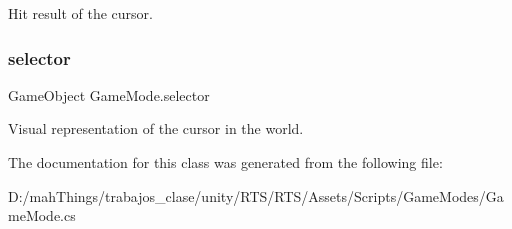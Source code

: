 Hit result of the cursor. 

\mbox{\label{class_game_mode_a01e79f1e24fe9681e06b53d81eb81293}} 
\subsubsection{\texorpdfstring{selector}{selector}}
{\footnotesize\ttfamily Game\+Object Game\+Mode.\+selector\hspace{0.3cm}{\ttfamily [protected]}}



Visual representation of the cursor in the world. 



The documentation for this class was generated from the following file\+:\begin{DoxyCompactItemize}
\item 
D\+:/mah\+Things/trabajos\+\_\+clase/unity/\+R\+T\+S/\+R\+T\+S/\+Assets/\+Scripts/\+Game\+Modes/Game\+Mode.\+cs\end{DoxyCompactItemize}
